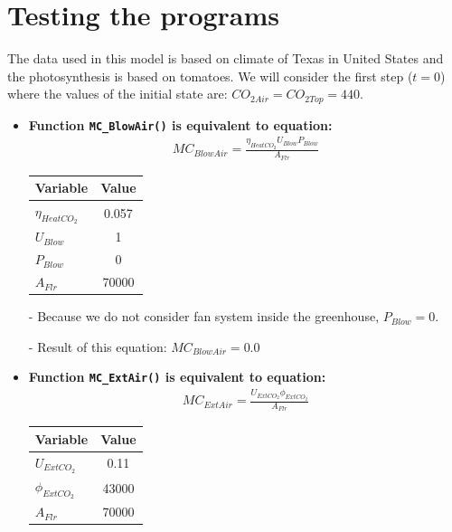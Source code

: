 \documentclass[a4paper]{article}
\numberwithin{equation}{section}
\begin{document}
\section{Testing the programs}
The data used in this model is based on climate of Texas in United States and the photosynthesis is based on tomatoes. We will consider the first step (\( t = 0 \)) where the values of the initial state are: \( CO_{2Air} = CO_{2Top} = 440 \).
\begin{itemize}
  \item \textbf{Function \texttt{MC\_BlowAir()} is equivalent to equation:}
        \begin{align*}
          MC_{BlowAir} = \frac{\eta_{HeatCO_2}U_{Blow}P_{Blow}}{A_{Flr}}
        \end{align*}

        \begin{table}[H]
          \centering
          \begin{tabular}{@{}lS@{}}
            \toprule
            \textbf{Variable}   & \textbf{Value} \\
            \midrule
            \( \eta_{HeatCO_2} \) & 0.057          \\
            \( U_{Blow} \)        & 1              \\
            \( P_{Blow} \)        & 0              \\
            \( A_{Flr} \)         & 70000          \\
            \bottomrule
          \end{tabular}
        \end{table}

  \item[-] Because we do not consider fan system inside the greenhouse, \( P_{Blow} = 0 \).
  \item[-] Result of this equation: \( MC_{BlowAir} = 0.0 \)

  \item \textbf{Function \texttt{MC\_ExtAir()} is equivalent to equation:}
        \begin{align*}
          MC_{ExtAir} = \frac{U_{ExtCO_2}\phi_{ExtCO_2}}{A_{Flr}}
        \end{align*}

        \begin{table}[H]
          \centering
          \begin{tabular}{@{}lS@{}}
            \toprule
            \textbf{Variable}  & \textbf{Value} \\
            \midrule
            \( U_{ExtCO_2} \)    & 0.11           \\
            \( \phi_{ExtCO_2} \) & 43000          \\
            \( A_{Flr} \)        & 70000          \\
            \bottomrule
          \end{tabular}
        \end{table}


\end{itemize}
\end{document}
